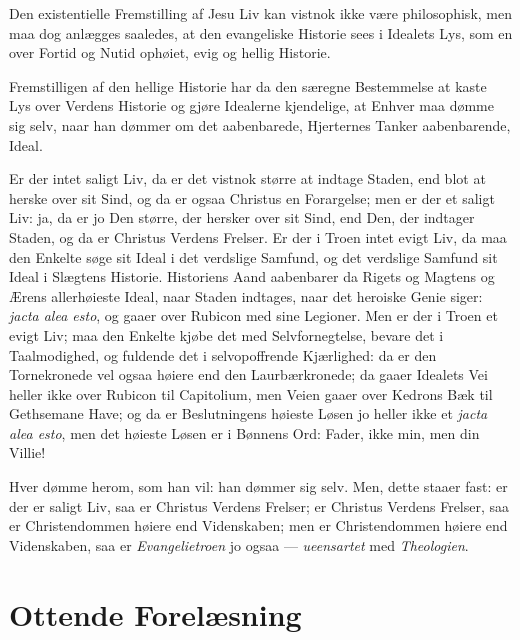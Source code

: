 \documentclass[12pt,a4paper]{book}
\newcommand{\opage}[1]{\marginnote{\footnotesize\textit{[#1]}}}
\begin{document}
Den existentielle Fremstilling af Jesu Liv kan vistnok ikke være
philosophisk, men maa dog anlægges saaledes, at den evangeliske Historie
sees i Idealets Lys, som en over Fortid og Nutid ophøiet, evig og hellig
Historie.

Fremstilligen af den hellige Historie har da den særegne Bestemmelse at
kaste Lys over Verdens Historie og gjøre Idealerne kjendelige, at Enhver
maa dømme sig selv, naar han dømmer om det aabenbarede, Hjerternes Tanker
aabenbarende, Ideal.

Er der intet saligt Liv, da er det vistnok større at indtage Staden, end
blot at herske over sit Sind, og da er ogsaa Christus en Forargelse; men
er der et saligt Liv: ja, da er jo Den større, der hersker over sit Sind,
end Den, der indtager Staden, og da er Christus Verdens Frelser. Er der
i Troen intet evigt Liv, da maa den Enkelte søge sit Ideal i det
verdslige Samfund, og det verdslige Samfund sit Ideal i Slægtens
Historie. Historiens Aand aabenbarer da Rigets og Magtens og Ærens
allerhøieste Ideal, naar Staden indtages, naar det heroiske Genie siger:
\textit{jacta alea esto}, og gaaer over Rubicon med sine Legioner. Men
er der i Troen et evigt Liv; maa den Enkelte kjøbe det med
Selvfornegtelse, bevare det i Taalmodighed, og fuldende det i
selvopoffrende Kjærlighed: da er den Tornekronede vel ogsaa høiere end
den Laurbærkronede; da gaaer Idealets Vei heller ikke over Rubicon til
Capitolium, men Veien gaaer over Kedrons Bæk til Gethsemane Have; og da
er Beslutningens høieste Løsen jo
\opage{96} heller ikke et \textit{jacta alea esto}, men det høieste Løsen er i
Bønnens Ord: Fader, ikke min, men din Villie!

Hver dømme herom, som han vil: han dømmer sig selv. Men, dette staaer
fast: er der er saligt Liv, saa er Christus Verdens Frelser; er Christus
Verdens Frelser, saa er Christendommen høiere end Videnskaben; men er
Christendommen høiere end Videnskaben, saa er \emph{Evangelietroen} jo
ogsaa --- \emph{ueensartet} med \emph{Theologien}.

\chapter*{Ottende Forelæsning}
\label{ch:forel8}
\end{document}
